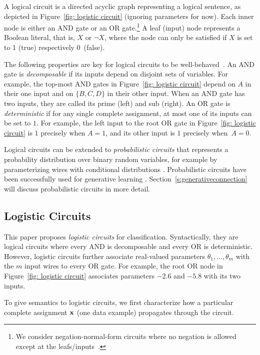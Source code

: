 \documentclass[letterpaper]{article} %
\begin{document}
A logical circuit is a directed acyclic graph  representing a logical sentence, as depicted in Figure~\ref{fig: logistic circuit} (ignoring parameters for now).
Each inner node is either an AND gate or an OR gate.\footnote{We consider negation-normal-form circuits where no negation is allowed except at the leafs/inputs~\cite{darwicheJAIR02}.}
A leaf (input) node represents a Boolean literal, that is, $X$ or $\neg X$, where the node can only be satisfied if $X$ is set to 1 (true) respectively 0~(false).

The following properties are key for logical circuits to be well-behaved~\cite{darwicheJAIR02}.
An AND gate is \emph{decomposable} if its inputs depend on disjoint sets of variables.
For example, the top-most AND gates in Figure~\ref{fig: logistic circuit} depend on $A$ in their one input and on $\{B,C,D\}$ in their other input.
When an AND gate has two inputs, they are called its prime (left) and sub (right).
An OR gate is \emph{deterministic} if for any single complete assignment, at most one of its inputs can be set to $1$. For example, the left input to the root OR gate  in Figure~\ref{fig: logistic circuit} is $1$ precisely when $A=1$, and its other input is $1$ precisely when~$A=0$.


Logical circuits can be extended to \textit{probabilistic circuits} that represents a probability distribution over binary random variables, for example by parameterizing wires with conditional distributions \cite{KisaVCD14}.
Probabilistic circuits have been successfully used for generative learning \cite{Liang2017}. Section~\ref{s:generativeconnection} will discuss probabilistic circuits in more detail.

\subsection{Logistic Circuits}
\label{s: logistic circuits}
This paper proposes \emph{logistic circuits} for classification. Syntactically, they are logical circuits where every AND is decomposable and every OR is deterministic.
However, logistic circuits further associate real-valued parameters $\theta_1, \dots, \theta_m$ with the $m$ input wires to every OR gate. For example, the root OR node in Figure~\ref{fig: logistic circuit} associates parameters $-2.6$ and $-5.8$ with its two inputs.

To give semantics to logistic circuits, we first characterize how a particular complete assignment $\bf x$ (one data example) propagates through the circuit.
\end{document}
